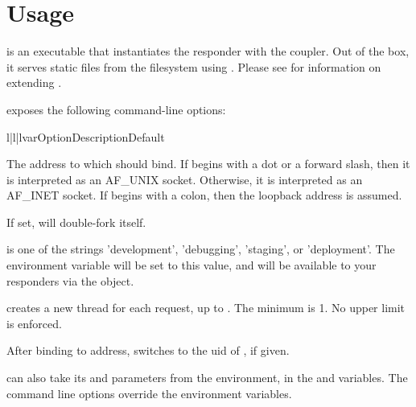 \chapter{Usage}

 is an executable that instantiates the 
responder with the  coupler. Out of the box, it serves static
files from the filesystem using . Please see  for information on extending .

 exposes the following command-line options:


\begin{tableiii}{l|l|l}{var}{Option}{Description}{Default}

    {The address to which  should bind. If  begins
    with a dot or a forward slash, then it is interpreted as an AF_UNIX socket.
    Otherwise, it is interpreted as an AF_INET socket. If  begins
    with a colon, then the loopback address is assumed.} {}

    {If set,  will double-fork itself.}
    {}

    { is one of the strings 'development', 'debugging', 'staging', or
    'deployment'.  The  environment variable will be set to
    this value, and will be available to your responders via the
     object.} {}

    { creates a new thread for each request, up to .
    The minimum is 1. No upper limit is enforced.}
    {}

    {After binding to address,  switches to the uid of
    , if given.}
    {}

\end{tableiii}


 can also take its  and  parameters from
the environment, in the  and 
variables. The command line options override the environment variables.
